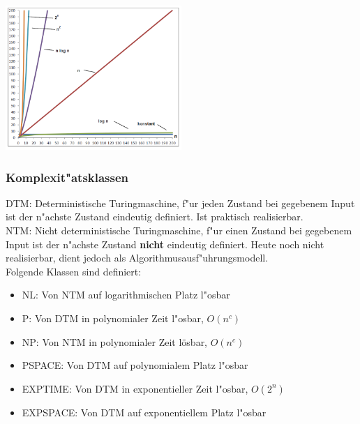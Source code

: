\begin{center}
{\includegraphics[width=0.5\textwidth]{images/Algorithmen/Wachstumsfunktionen.png}}
\label{Fig: Verschiedene Wachstumsfunktionen}
\end{center}



\subsubsection{Komplexit"atsklassen}
DTM: Deterministische Turingmaschine, f"ur jeden Zustand bei gegebenem Input ist der n"achste Zustand eindeutig definiert. Ist praktisch realisierbar. \\
NTM: Nicht deterministische Turingmaschine, f"ur einen Zustand bei gegebenem Input ist der n"achste Zustand \textbf{nicht} eindeutig definiert. Heute noch nicht realisierbar, dient jedoch als Algorithmusausf"uhrungsmodell.\\
Folgende Klassen sind definiert:\\
\begin{itemize}
\item NL:       Von NTM auf logarithmischen Platz l"osbar 
\item P:        Von DTM in polynomialer Zeit l"osbar, $O(n^c)$
\item NP:       Von NTM in polynomialer Zeit lösbar, $O(n^c)$
\item PSPACE:   Von DTM auf polynomialem Platz l"osbar
\item EXPTIME:  Von DTM in exponentieller Zeit l"osbar, $O(2^n)$
\item EXPSPACE: Von DTM auf exponentiellem Platz l"osbar
\end{itemize}

